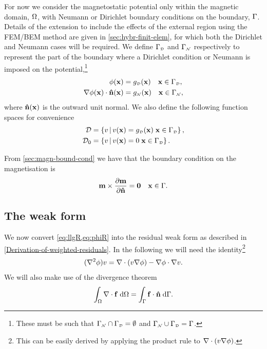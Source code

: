 For now we consider the magnetostatic potential only within the magnetic domain, $\Omega$, with Neumann or Dirichlet boundary conditions on the boundary, ${\Gamma}$.
Details of the extension to include the effects of the external region using the FEM/BEM method are given in \cref{sec:hybr-finit-elem}, for which both the Dirichlet and Neumann cases will be required.
We define ${\Gamma}_{\scriptscriptstyle{\mathcal{D}}}$ and ${\Gamma}_{\scriptscriptstyle{\mathcal{N}}}$ respectively to represent the part of the boundary where a Dirichlet condition or Neumann is imposed on the potential,\footnote{These must be such that ${\Gamma}_{\scriptscriptstyle{\mathcal{N}}} \cap {\Gamma}_{\scriptscriptstyle{\mathcal{D}}} = \emptyset$ and ${\Gamma}_{\scriptscriptstyle{\mathcal{N}}} \cup {\Gamma}_{\scriptscriptstyle{\mathcal{D}}} = {\Gamma}$.} \ie
\begin{equation}
  \begin{aligned}
    \phi(\boldsymbol{\mathrm{x}}) &= g_{\scriptscriptstyle{\mathcal{D}}}(\boldsymbol{\mathrm{x}}) \quad  \boldsymbol{\mathrm{x}} \in {\Gamma}_{\scriptscriptstyle{\mathcal{D}}}, \\
    \nabla \phi(\boldsymbol{\mathrm{x}}) \cdot \boldsymbol{\mathrm{\hat{n}}}(\boldsymbol{\mathrm{x}}) &= g_{\scriptscriptstyle{\mathcal{N}}}(\boldsymbol{\mathrm{x}}) \quad  \boldsymbol{\mathrm{x}} \in {\Gamma}_{\scriptscriptstyle{\mathcal{N}}},
  \end{aligned}
\end{equation}
where $\boldsymbol{\mathrm{\hat{n}}}(\boldsymbol{\mathrm{x}})$ is the outward unit normal.
We also define the following function spaces for convenience
\begin{equation}
\begin{aligned}
  \label{eq:037}
  \Dfs & = \setst{ v }{ v(\xv) = g_\Dir(\xv) \;  \xv \in \boundd_\Dir }, \\
  \Dfs_0 &= \setst{ v }{ v(\xv) = 0 \;  \xv \in \boundd_\Dir }.
\end{aligned}
\end{equation}

From \cref{sec:magn-bound-cond} we have that the boundary condition on the magnetisation is
\begin{equation}
  \label{eq:m-bc}
  \mv \times \dmdn = \zerov \quad \xv \in \boundd.
\end{equation}


\subsection{The weak form}
\label{sec:weak-form-residuals}

We now convert \cref{eq:llgR,eq:phiR} into the residual weak form as described in \cref{Derivation-of-weighted-residuals}.
In the following we will need the identity\footnote{This can be easily derived by applying the product rule to $\nabla \cdot (v \nabla \phi)$.}
\begin{equation}
  (\lap \phim) \test = \div (v \grad \phim) - \grad \phim \cdot \grad v.
  \label{eq:20}
\end{equation}
We will also make use of the divergence theorem
\begin{equation}
  \intd{\div \fv} = \intb{\fv \cdot \nv}.
  \label{eq:div-thm}
\end{equation}

